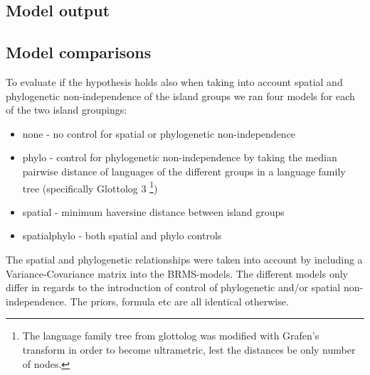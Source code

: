 \documentclass[unnumsec,webpdf,modern,medium]{oup-authoring-template}
\begin{document}


\newpage
\subsection{Model output}









\FloatBarrier
\newpage
\subsection{Model comparisons}
\label{appendix_model_fit_scores}
To evaluate if the hypothesis holds also when taking into account spatial and phylogenetic non-independence of the island groups we ran four models for each of the two island groupings:

\begin{itemize}

    \item none - no control for spatial or phylogenetic non-independence
    \item phylo - control for phylogenetic non-independence by taking the median pairwise distance of languages of the different groups in a language family tree (specifically Glottolog 3 \citet{glottolog3}\footnote{The language family tree from glottolog was modified with Grafen's transform in order to become ultrametric, lest the distances be only number of nodes.})
    \item spatial - minimum haversine distance between island groups
    \item spatialphylo - both spatial and phylo controls
    
\end{itemize}

The spatial and phylogenetic relationships were taken into account by including a Variance-Covariance matrix into the BRMS-models. The different models only differ in regards to the introduction of control of phylogenetic and/or spatial non-independence. The priors, formula etc are all identical otherwise.
\end{document}
